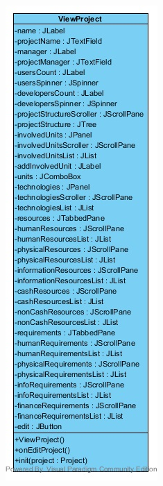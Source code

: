 \begin{figure}[H]
\begin{subfigure}[b]{0.3\textwidth}
		\includegraphics[width=\textwidth]{img/class-design/ui/ViewProject.jpg}

\end{subfigure}
\end{figure}

